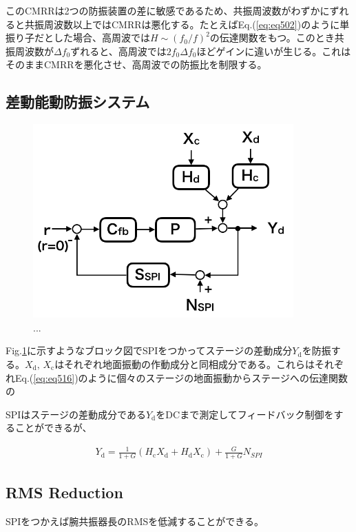 このCMRRは2つの防振装置の差に敏感であるため、共振周波数がわずかにずれると共振周波数以上ではCMRRは悪化する。たとえばEq.(\ref{eq:eq502})のように単振り子だとした場合、高周波では$H\sim{({f_0}/{f})^2}$の伝達関数をもつ。このとき共振周波数が$\Delta{f_0}$ずれると、高周波では$2f_0\Delta{f_0}$ほどゲインに違いが生じる。これはそのままCMRRを悪化させ、高周波での防振比を制限する。


\subsection{差動能動防振システム}
\begin{figure}[h]
  \begin{center}   
    \includegraphics[width=10cm]{./img_chap5/img511.png}
    \caption{...} \label{img:img511}
  \end{center}
\end{figure}
Fig.\ref{img:img511}に示すようなブロック図でSPIをつかってステージの差動成分$Y_{\mathrm{d}}$を防振する。$X_{\mathrm{d}},\,X_{\mathrm{c}}$はそれぞれ地面振動の作動成分と同相成分である。これらはそれぞれEq.(\ref{eq:eq516})のように個々のステージの地面振動からステージへの伝達関数の

SPIはステージの差動成分である$Y_{\mathrm{d}}$をDCまで測定してフィードバック制御をすることができるが、



\begin{eqnarray}
  Y_{\mathrm{d}}=\frac{1}{1+G} \left( H_{\mathrm{c}} X_{\mathrm{d}} + H_{\mathrm{d}}X_{\mathrm{c}} \right) + \frac{G}{1+G} N_{SPI}
\end{eqnarray}
\subsection{RMS Reduction}
SPIをつかえば腕共振器長のRMSを低減することができる。


